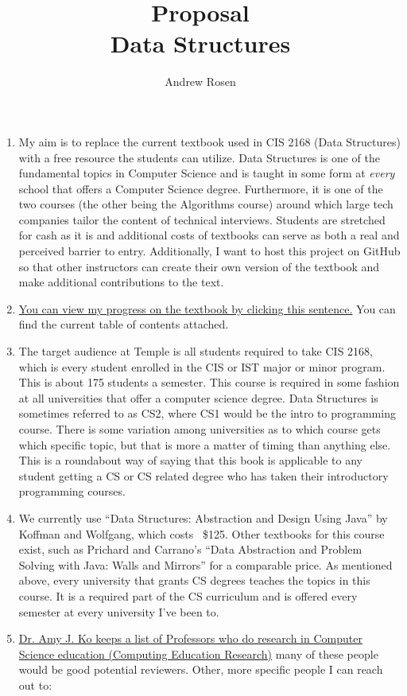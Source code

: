 \documentclass[10pt,a4paper]{article}
\author{Andrew Rosen}
\title{Proposal \\ Data Structures}
\date{}
\begin{document}
	
\maketitle

\begin{enumerate}
	\item My aim is to replace the current textbook used in CIS 2168 (Data Structures) with a free resource the students can utilize. 
	Data Structures is one of the fundamental topics in Computer Science and is taught in some form at \emph{every} school that offers a Computer Science degree. 
	Furthermore, it is one of the two courses (the other being the Algorithms course) around which large tech companies tailor the content of technical interviews.  
	Students are stretched for cash as it is and additional costs of textbooks can serve as both a real and perceived barrier to entry.
	Additionally, I want to host this project on GitHub so that other instructors can create their own version of the textbook and make additional contributions to the text. 
	\item\href{https://github.com/abrosen/DataStructuresTextbook}{You can view my progress on the textbook by clicking this sentence.} 
	You can find the current table of contents attached.
	\item The target audience at Temple is all students required to take CIS 2168, which is every student enrolled in the CIS or IST major or minor program.  This is about 175 students a semester.  This course is required in some fashion at all universities that offer a computer science degree. Data Structures is sometimes referred to as CS2, where CS1 would be the intro to programming course.  There is some variation among universities as to which course gets which specific topic, but that is more a matter of timing than anything else.  This is a roundabout way of saying that this book is applicable to any student getting a CS or CS related degree who has taken their introductory programming courses.  
	\item We currently use ``Data Structures: Abstraction and Design Using Java'' by Koffman and Wolfgang, which costs ~\$125.  Other textbooks for this course exist, such as Prichard and Carrano’s ``Data Abstraction and Problem Solving with Java: Walls and Mirrors'' for a comparable price.  As mentioned above, every university that grants CS degrees teaches the topics in this course.  It is a required part of the CS curriculum and is offered every semester at every university I’ve been to.
	\item \href{https://faculty.washington.edu/ajko/cer}{Dr. Amy J. Ko keeps a list of Professors who do research in Computer Science education (Computing Education Research)}  many of these people would be good potential reviewers.  Other, more specific people I can reach out to: 

\end{enumerate}
\end{document}
